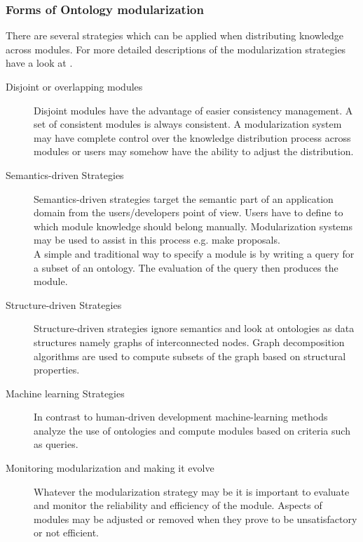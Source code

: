 \subsubsection{Forms of Ontology modularization}
There are several strategies which can be applied when distributing
knowledge across modules.
For more detailed descriptions of the modularization strategies have a look
at \cite{parent2009}.
\begin{description}
        \item[Disjoint or overlapping modules] Disjoint modules have the advantage
                of easier consistency management. A set of consistent modules is
                always consistent. A modularization system may have complete control
                over the knowledge distribution process across modules or users may
                somehow have the ability to adjust the distribution.
        \item[Semantics-driven Strategies] Semantics-driven strategies target the
                semantic part of an application domain from the users/developers
                point of view. Users have to define to which module knowledge should
                belong manually. Modularization systems may be used to assist in this
                process e.g. make proposals.\\
                A simple and traditional way to specify a module is by writing a query
                for a subset of an ontology. The evaluation of the query then produces
                the module.
        \item[Structure-driven Strategies] Structure-driven strategies ignore semantics
                and look at ontologies as data structures namely graphs of interconnected
                nodes. Graph decomposition algorithms are used to compute subsets of
                the graph based on structural properties.
        \item[Machine learning Strategies] In contrast to human-driven development
                machine-learning methods analyze the use of ontologies and compute
                modules based on criteria such as queries.
        \item[Monitoring modularization and making it evolve] Whatever the modularization
                strategy may be it is important to evaluate and monitor the reliability and
                efficiency of the module. Aspects of modules may be adjusted or removed
                when they prove to be unsatisfactory or not efficient.
\end{description}

